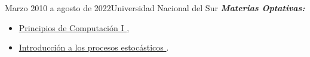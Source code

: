 \documentclass{CV_template}
\begin{document}
\begin{paracol}{2}
\begin{rightcolumn}


\vspace{6pt}


    
            {Marzo 2010 a agosto de 2022}{Universidad Nacional del Sur}        
    \vspace{-6pt}
    \hspace{0.2cm}\textit{\small\textbf{Materias Optativas:}}
    \vspace{-6pt}
        \begin{itemize}
            \footnotesize
            \item \href{https://1drv.ms/b/s!Anr_tvZIYrhwg-Q3BLmxwlzX5PWIFQ}{Principios de Computación I  {\footnotesize\faExternalLink}},
            \item \href{https://1drv.ms/b/s!Anr_tvZIYrhwg-Q45aG0UgNb-R70FA?e=44lo7C}{Introducción a los procesos estocásticos  {\footnotesize\faExternalLink}}.
        \end{itemize} 



\end{rightcolumn}
\end{paracol}
\end{document}

